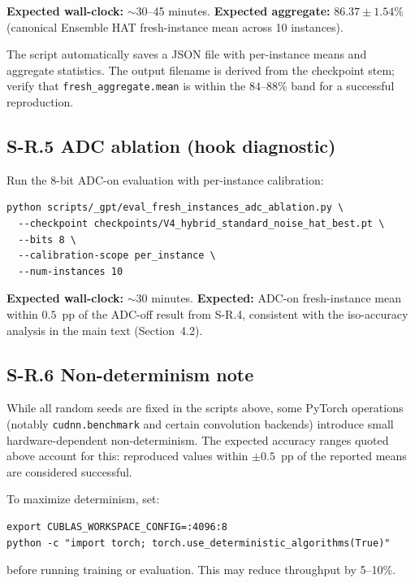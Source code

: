 \textbf{Expected wall-clock:} $\sim$30--45 minutes.  
\textbf{Expected aggregate:} $86.37 \pm 1.54\%$ (canonical Ensemble HAT fresh-instance mean across 10 instances).

The script automatically saves a JSON file with per-instance means and aggregate statistics. The output filename is derived from the checkpoint stem; verify that \texttt{fresh\_aggregate.mean} is within the $84$--$88\%$ band for a successful reproduction.

\subsection*{S-R.5 ADC ablation (hook diagnostic)}

Run the 8-bit ADC-on evaluation with per-instance calibration:

\begin{verbatim}
python scripts/_gpt/eval_fresh_instances_adc_ablation.py \
  --checkpoint checkpoints/V4_hybrid_standard_noise_hat_best.pt \
  --bits 8 \
  --calibration-scope per_instance \
  --num-instances 10
\end{verbatim}

\textbf{Expected wall-clock:} $\sim$30 minutes.  
\textbf{Expected:} ADC-on fresh-instance mean within $0.5$~pp of the ADC-off result from S-R.4, consistent with the iso-accuracy analysis in the main text (Section~4.2).

\subsection*{S-R.6 Non-determinism note}

While all random seeds are fixed in the scripts above, some PyTorch operations (notably \texttt{cudnn.benchmark} and certain convolution backends) introduce small hardware-dependent non-determinism. The expected accuracy ranges quoted above account for this: reproduced values within $\pm 0.5$~pp of the reported means are considered successful.

To maximize determinism, set:
\begin{verbatim}
export CUBLAS_WORKSPACE_CONFIG=:4096:8
python -c "import torch; torch.use_deterministic_algorithms(True)"
\end{verbatim}
before running training or evaluation. This may reduce throughput by 5--10\%.
